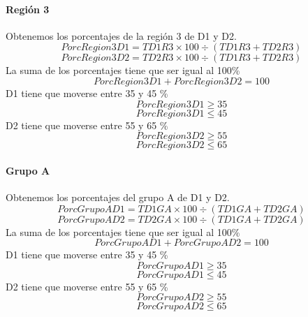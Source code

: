 \paragraph{Región 3} Obtenemos los porcentajes de la región 3 de D1 y D2.  
\begin{equation}
PorcRegion3D1 = TD1R3 \times 100 \div (TD1R3 + TD2R3)
\end{equation}
\begin{equation}
PorcRegion3D2 = TD2R3 \times 100 \div (TD1R3 + TD2R3)
\end{equation}
La suma de los porcentajes tiene que ser igual al 100\%
\begin{equation}
PorcRegion3D1 + PorcRegion3D2 = 100
\end{equation}
D1 tiene que moverse entre 35 y 45 \%
\begin{equation}
PorcRegion3D1 \geq 35
\end{equation}
\begin{equation}
PorcRegion3D1 \leq 45
\end{equation}
D2 tiene que moverse entre 55 y 65 \%
\begin{equation}
PorcRegion3D2 \geq 55
\end{equation}
\begin{equation}
PorcRegion3D2 \leq 65
\end{equation}
\paragraph{Grupo A} Obtenemos los porcentajes del grupo A de D1 y D2.  
\begin{equation}
PorcGrupoAD1 = TD1GA \times 100 \div (TD1GA + TD2GA)
\end{equation}
\begin{equation}
PorcGrupoAD2 = TD2GA \times 100 \div (TD1GA + TD2GA)
\end{equation}
La suma de los porcentajes tiene que ser igual al 100\%
\begin{equation}
PorcGrupoAD1 + PorcGrupoAD2 = 100
\end{equation}
D1 tiene que moverse entre 35 y 45 \%
\begin{equation}
PorcGrupoAD1 \geq 35
\end{equation}
\begin{equation}
PorcGrupoAD1 \leq 45
\end{equation}
D2 tiene que moverse entre 55 y 65 \%
\begin{equation}
PorcGrupoAD2 \geq 55
\end{equation}
\begin{equation}
PorcGrupoAD2 \leq 65
\end{equation}
